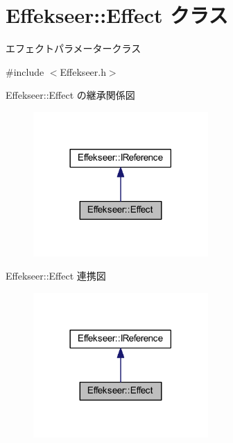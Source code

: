 \hypertarget{class_effekseer_1_1_effect}{}\section{Effekseer\+:\+:Effect クラス}
\label{class_effekseer_1_1_effect}


エフェクトパラメータークラス  




{\ttfamily \#include $<$Effekseer.\+h$>$}



Effekseer\+:\+:Effect の継承関係図\nopagebreak
\begin{figure}[H]
\begin{center}
\leavevmode
\includegraphics[width=189pt]{class_effekseer_1_1_effect__inherit__graph}
\end{center}
\end{figure}


Effekseer\+:\+:Effect 連携図\nopagebreak
\begin{figure}[H]
\begin{center}
\leavevmode
\includegraphics[width=189pt]{class_effekseer_1_1_effect__coll__graph}
\end{center}
\end{figure}
